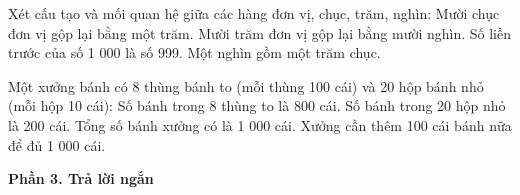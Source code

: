 \begin{ex} %
Xét cấu tạo và mối quan hệ giữa các hàng đơn vị, chục, trăm, nghìn:
\choiceTF
{\True Mười chục đơn vị gộp lại bằng một trăm.}
{Mười trăm đơn vị gộp lại bằng mười nghìn.}
{\True Số liền trước của số 1 000 là số 999.}
{\True Một nghìn gồm một trăm chục.}
\end{ex}

\begin{ex} %
Một xưởng bánh có 8 thùng bánh to (mỗi thùng 100 cái) và 20 hộp bánh nhỏ (mỗi hộp 10 cái):
\choiceTF
{\True Số bánh trong 8 thùng to là 800 cái.}
{\True Số bánh trong 20 hộp nhỏ là 200 cái.}
{\True Tổng số bánh xưởng có là 1 000 cái.}
{Xưởng cần thêm 100 cái bánh nữa để đủ 1 000 cái.}
\end{ex}

\textbf{Phần 3. Trả lời ngắn}

